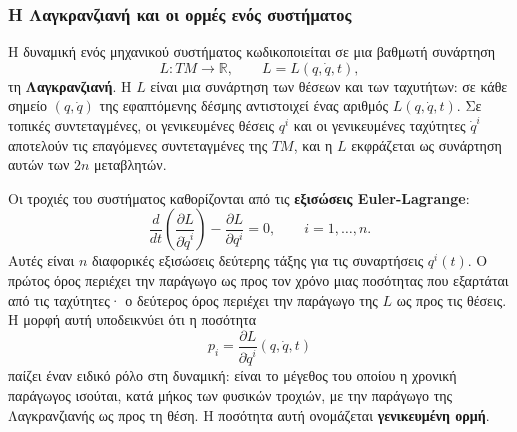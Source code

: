 \documentclass[11pt,a4paper,twoside,openright]{book}
\begin{document}
\subsubsection{Η Λαγκρανζιανή και οι ορμές ενός συστήματος}

Η δυναμική ενός μηχανικού συστήματος κωδικοποιείται σε μια βαθμωτή συνάρτηση
\begin{equation}
L: TM \to \mathbb{R}, \qquad L = L(q, \dot{q}, t),
\end{equation}
τη \textbf{Λαγκρανζιανή}. Η $L$ είναι μια συνάρτηση των θέσεων και των ταχυτήτων: σε κάθε σημείο $(q, \dot{q})$ της εφαπτόμενης δέσμης αντιστοιχεί ένας αριθμός $L(q, \dot{q}, t)$. Σε τοπικές συντεταγμένες, οι γενικευμένες θέσεις $q^i$ και οι γενικευμένες ταχύτητες $\dot{q}^i$ αποτελούν τις επαγόμενες συντεταγμένες της $TM$, και η $L$ εκφράζεται ως συνάρτηση αυτών των $2n$ μεταβλητών.

Οι τροχιές του συστήματος καθορίζονται από τις \textbf{εξισώσεις Euler-Lagrange}:
\begin{equation}
\frac{d}{dt} \left( \frac{\partial L}{\partial \dot{q}^i} \right) - \frac{\partial L}{\partial q^i} = 0, \qquad i = 1, \dots, n.
\end{equation}
Αυτές είναι $n$ διαφορικές εξισώσεις δεύτερης τάξης για τις συναρτήσεις $q^i(t)$. Ο πρώτος όρος περιέχει την παράγωγο ως προς τον χρόνο μιας ποσότητας που εξαρτάται από τις ταχύτητες· ο δεύτερος όρος περιέχει την παράγωγο της $L$ ως προς τις θέσεις. Η μορφή αυτή υποδεικνύει ότι η ποσότητα
\begin{equation}
p_i = \frac{\partial L}{\partial \dot{q}^i}(q, \dot{q}, t)
\end{equation}
παίζει έναν ειδικό ρόλο στη δυναμική: είναι το μέγεθος του οποίου η χρονική παράγωγος ισούται, κατά μήκος των φυσικών τροχιών, με την παράγωγο της Λαγκρανζιανής ως προς τη θέση. Η ποσότητα αυτή ονομάζεται \textbf{γενικευμένη ορμή}.
\end{document}
